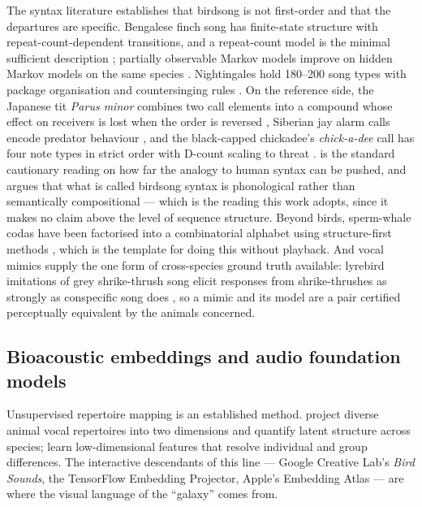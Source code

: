\documentclass[10pt,twocolumn,a4paper]{article}
\begin{document}
The syntax literature establishes that birdsong is not first-order and that the departures
are specific. Bengalese finch song has finite-state structure with repeat-count-dependent
transitions, and a repeat-count model is the minimal sufficient
description \citep{okanoya2004,jin2011}; partially observable Markov models improve on
hidden Markov models on the same species \citep{lu2025}. Nightingales hold 180--200 song
types with package organisation \citep{hultsch1989} and countersinging
rules \citep{hultsch1981}. On the reference side, the Japanese tit \emph{Parus minor}
combines two call elements into a compound whose effect on receivers is lost when the order is
reversed \citep{suzuki2016}, Siberian jay alarm calls encode predator
behaviour \citep{griesser2008}, and the black-capped chickadee's \emph{chick-a-dee} call has
four note types in strict order with D-count scaling to
threat \citep{freeberg2003}. \citet{berwick2011} is the standard cautionary reading on how
far the analogy to human syntax can be pushed, and argues that what is called birdsong syntax
is phonological rather than semantically compositional --- which is the reading this work
adopts, since it makes no claim above the level of sequence structure. Beyond birds, sperm-whale codas have been
factorised into a combinatorial alphabet using structure-first
methods \citep{sharma2024}, which is the template for doing this without playback. And
vocal mimics supply the one form of cross-species ground truth available: lyrebird
imitations of grey shrike-thrush song elicit responses from shrike-thrushes as strongly as
conspecific song does \citep{dalziell2012}, so a mimic and its model are a pair certified
perceptually equivalent by the animals concerned.

\subsection{Bioacoustic embeddings and audio foundation models}

Unsupervised repertoire mapping is an established method. \citet{sainburg2020} project
diverse animal vocal repertoires into two dimensions and quantify latent structure across
species; \citet{goffinet2021} learn low-dimensional features that resolve individual and
group differences. The interactive descendants of this line --- Google Creative Lab's
\emph{Bird Sounds}, the TensorFlow Embedding Projector, Apple's Embedding Atlas --- are
where the visual language of the ``galaxy'' comes from.
\end{document}
